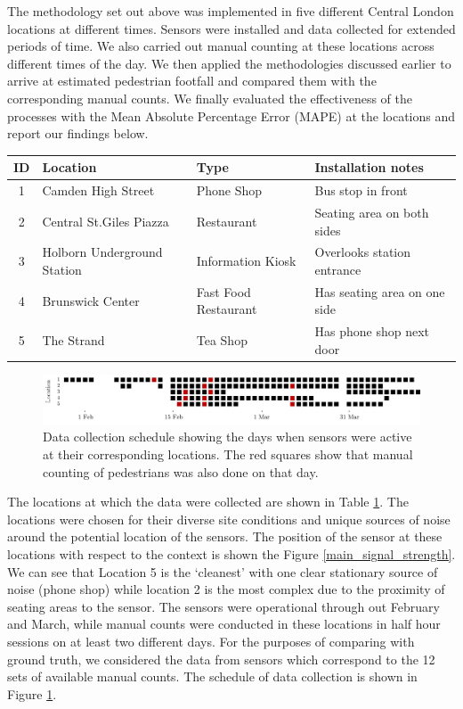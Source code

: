The methodology set out above was implemented in five different Central London
locations at different times. Sensors were installed and data collected for
extended periods of time. We also carried out manual counting at these locations
across different times of the day. We then applied the methodologies discussed
earlier to arrive at estimated pedestrian footfall and compared them with the
corresponding manual counts.  We finally evaluated the effectiveness of the
processes with the Mean Absolute Percentage Error (MAPE) at the locations and
report our findings below.

\begin{table}
	{\begin{tabular}{clll} 
		\toprule
		 ID & Location & Type & Installation notes\\
		 \midrule
		 1 & Camden High Street & Phone Shop & Bus stop in front\\
		 2 & Central St.Giles Piazza & Restaurant & Seating area on both sides\\
		 3 & Holborn Underground Station & Information Kiosk & Overlooks station entrance\\
		 4 & Brunswick Center & Fast Food Restaurant & Has seating area on one side\\
		 5 & The Strand & Tea Shop & Has phone shop next door \\
		 \bottomrule
	\end{tabular}}
	\label{locations-table}
\end{table}

\begin{figure}
	\begin{center}
		\includegraphics [width=0.90\linewidth] {images/main_schedule.jpeg}
		\caption{Data collection schedule showing the days when sensors were active at their corresponding locations. The red squares show that manual counting of pedestrians was also done on that day.}
		\label{main_schedule}
	\end{center}
\end{figure}

The locations at which the data were collected are shown in Table
\ref{locations-table}. The locations were chosen for their diverse site
conditions and unique sources of noise around the potential location of the
sensors. The position of the sensor at these locations with respect to the
context is shown the Figure \ref{main_signal_strength}. We can see that Location
5 is the `cleanest' with one clear stationary source of noise (phone shop)
while location 2 is the most complex due to the proximity of seating areas
to the sensor.  The sensors were operational through out February and March,
while manual counts were conducted in these locations in half hour sessions on at
least two different days. For the purposes of comparing with ground truth, we
considered the data from sensors which correspond to the 12 sets of
available manual counts. The schedule of data collection is shown in Figure
\ref{main_schedule}.


